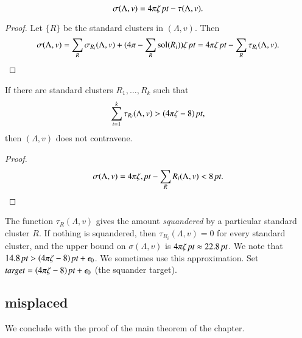 \begin{lemma}
    $$\sigma(\Lambda,v) = {4\pi \zeta\,\hbox{\it pt}} - \tau(\Lambda,v).$$
\end{lemma}

\begin{proof} Let $\{R\}$ be the standard clusters in $(\Lambda,v)$. Then
    $$
    \sigma(\Lambda,v) = \sum_R\sigma_{R_i}(\Lambda,v) +
        (4\pi-\sum_R\operatorname{sol}(R_i))\zeta\,\hbox{\it pt} = 4\pi \zeta\,\hbox{\it pt} - \sum_R\tau_{R_i}(\Lambda,v).
    $$
\end{proof}


\begin{lemma}
If there are standard clusters $R_1,\ldots,R_k$ such that
$$\sum_{i=1}^k \tau_{R_i}(\Lambda,v)> (4\pi\zeta-8)\,\hbox{\it pt},$$
then $(\Lambda,v)$ does not contravene.
\end{lemma}

\begin{proof}
$$\sigma(\Lambda,v) = 4\pi\zeta,\hbox{\it pt} -\sum_R{R_i}(\Lambda,v) < 8\,\hbox{\it pt}.$$
\end{proof}


The function $\tau_R(\Lambda,v)$ gives the amount {\it squandered\/} by a
particular standard cluster $R$.  If nothing is squandered, then
$\tau_{R_i}(\Lambda,v)=0$ for every standard cluster, and the upper bound
on $\sigma(\Lambda,v)$ is
    $4\pi\zeta\,\hbox{\it pt}\approx 22.8\,\hbox{\it pt}$.
We note that $14.8\,\hbox{\it pt} > (4\pi\zeta-8)\,\hbox{\it pt}+\epsilon_0$.  We sometimes use this
approximation.  Set $\operatorname{\it{target}} = (4\pi\zeta-8)\,\hbox{\it pt}+\epsilon_0$ (the squander target).










\subsection{misplaced}


We conclude with the proof of the main theorem of the chapter.

